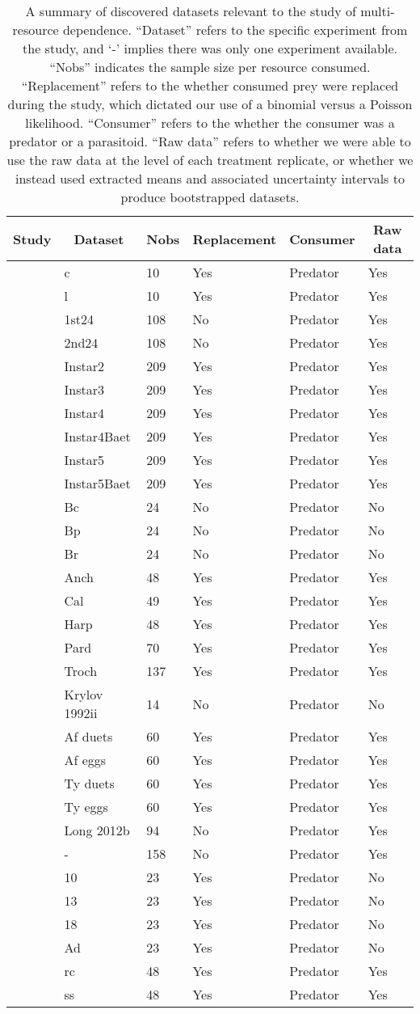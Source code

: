 \begin{table}[!tbp]
\caption{
      A summary of discovered datasets relevant to the study of multi-resource dependence.
      ``Dataset'' refers to the specific experiment from the study, and `-' implies there was only one experiment available.
      ``Nobs'' indicates the sample size per resource consumed.
      ``Replacement'' refers to the whether consumed prey were replaced during the study, which dictated our use of a binomial versus a Poisson likelihood.
      ``Consumer'' refers to the whether the consumer was a predator or a parasitoid.
      ``Raw data'' refers to whether we were able to use the raw data at the level of each treatment replicate, or whether we instead used extracted means and associated uncertainty intervals to produce bootstrapped datasets.
    \label{table:1pred2preydatasets}} 
\begin{center}
\begin{tabular}{llllll}
\hline\hline
\multicolumn{1}{c}{Study}&\multicolumn{1}{c}{Dataset}&\multicolumn{1}{c}{Nobs}&\multicolumn{1}{c}{Replacement}&\multicolumn{1}{c}{Consumer}&\multicolumn{1}{c}{Raw data}\tabularnewline
\hline
\citet{Chan:2017aa}&c&10&Yes&Predator&Yes\tabularnewline
\citet{Chan:2017aa}&l&10&Yes&Predator&Yes\tabularnewline
\citet{Colton:1987aa}&1st24&108&No&Predator&Yes\tabularnewline
\citet{Colton:1987aa}&2nd24&108&No&Predator&Yes\tabularnewline
\citet{Elliott:2006aa}&Instar2&209&Yes&Predator&Yes\tabularnewline
\citet{Elliott:2006aa}&Instar3&209&Yes&Predator&Yes\tabularnewline
\citet{Elliott:2006aa}&Instar4&209&Yes&Predator&Yes\tabularnewline
\citet{Elliott:2006aa}&Instar4Baet&209&Yes&Predator&Yes\tabularnewline
\citet{Elliott:2006aa}&Instar5&209&Yes&Predator&Yes\tabularnewline
\citet{Elliott:2006aa}&Instar5Baet&209&Yes&Predator&Yes\tabularnewline
\citet{Iyer:1996aa}&Bc&24&No&Predator&No\tabularnewline
\citet{Iyer:1996aa}&Bp&24&No&Predator&No\tabularnewline
\citet{Iyer:1996aa}&Br&24&No&Predator&No\tabularnewline
\citet{Kalinkat:2011bd}&Anch&48&Yes&Predator&Yes\tabularnewline
\citet{Kalinkat:2011bd}&Cal&49&Yes&Predator&Yes\tabularnewline
\citet{Kalinkat:2011bd}&Harp&48&Yes&Predator&Yes\tabularnewline
\citet{Kalinkat:2011bd}&Pard&70&Yes&Predator&Yes\tabularnewline
\citet{Kalinkat:2011bd}&Troch&137&Yes&Predator&Yes\tabularnewline
\citet{Krylov:1992aa}&Krylov 1992ii&14&No&Predator&No\tabularnewline
\citet{Lester:2002aa}&Af duets&60&Yes&Predator&Yes\tabularnewline
\citet{Lester:2002aa}&Af eggs&60&Yes&Predator&Yes\tabularnewline
\citet{Lester:2002aa}&Ty duets&60&Yes&Predator&Yes\tabularnewline
\citet{Lester:2002aa}&Ty eggs&60&Yes&Predator&Yes\tabularnewline
\citet{Long:2012aa}&Long 2012b&94&No&Predator&Yes\tabularnewline
\citet{Nachappa:2006aa}&-&158&No&Predator&Yes\tabularnewline
\citet{Ranta:1985aa}&10&23&Yes&Predator&No\tabularnewline
\citet{Ranta:1985aa}&13&23&Yes&Predator&No\tabularnewline
\citet{Ranta:1985aa}&18&23&Yes&Predator&No\tabularnewline
\citet{Ranta:1985aa}&Ad&23&Yes&Predator&No\tabularnewline
\citet{Wong:2005aa}&rc&48&Yes&Predator&Yes\tabularnewline
\citet{Wong:2005aa}&ss&48&Yes&Predator&Yes\tabularnewline
\hline
\end{tabular}\end{center}
\end{table}

